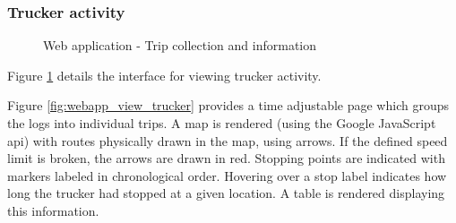 \subsubsection{Trucker activity}
\begin{figure}[H]
\centering
\caption{Web application - Trip collection and information}
\label{fig:webapp_trucker_details}
\end{figure}
Figure \ref{fig:webapp_trucker_details} details the interface for viewing trucker activity.

Figure \ref{fig:webapp_view_trucker} provides a time adjustable page which groups the logs into individual trips.
A map is rendered (using the Google JavaScript \Ac{api}) with routes physically drawn in the map, using arrows.
If the defined speed limit is broken, the arrows are drawn in red.
Stopping points are indicated with markers labeled in chronological order.
Hovering over a stop label indicates how long the trucker had stopped at a given location.
A table is rendered displaying this information.


